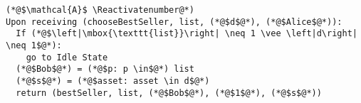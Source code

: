 \Suppressnumber
\begin{lstlisting}[label=distadv, style=numbers]
(*@$\mathcal{A}$ \Reactivatenumber@*)
Upon receiving (chooseBestSeller, list, (*@$d$@*), (*@$Alice$@*)):
  If (*@$\left|\mbox{\texttt{list}}\right| \neq 1 \vee \left|d\right| \neq 1$@*):
    go to Idle State
  (*@$Bob$@*) = (*@$p: p \in$@*) list
  (*@$s$@*) = (*@$asset: asset \in d$@*)
  return (bestSeller, list, (*@$Bob$@*), (*@$1$@*), (*@$s$@*))
\end{lstlisting}
